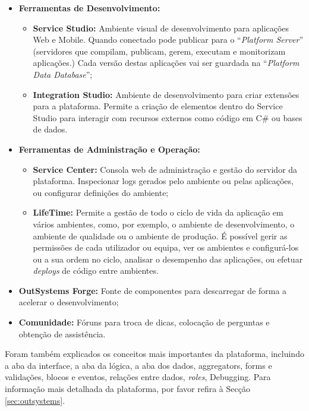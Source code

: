       \begin{itemize} 
        \item \textbf{Ferramentas de Desenvolvimento:}
          \begin{itemize}
            \item \textbf{Service Studio:} Ambiente visual de desenvolvimento para aplicações Web e Mobile. Quando conectado pode publicar para o ``\textit{Platform Server}'' (servidores que compilam, publicam, gerem, executam e monitorizam aplicações.) Cada versão destas aplicações vai ser guardada na ``\textit{Platform Data Database}'';
            \item \textbf{Integration Studio:} Ambiente de desenvolvimento para criar extensões para a plataforma. Permite a criação de elementos dentro do Service Studio para interagir com recursos externos como código em C\# ou bases de dados.
          \end{itemize}
        \item \textbf{Ferramentas de Administração e Operação:}
          \begin{itemize}
            \item \textbf{Service Center:} Consola web de administração e gestão do servidor da plataforma. Inspecionar logs gerados pelo ambiente ou pelas aplicações, ou configurar definições do ambiente;
            \item \textbf{LifeTime:} Permite a gestão de todo o ciclo de vida da aplicação em vários ambientes, como, por exemplo, o ambiente de desenvolvimento, o ambiente de qualidade ou o ambiente de produção. É possível gerir as permissões de cada utilizador ou equipa, ver os ambientes e configurá-los ou a sua ordem no ciclo, analisar o desempenho das aplicações, ou efetuar \textit{deploys} de código entre ambientes.
          \end{itemize}
        \item \textbf{OutSystems Forge:} Fonte de componentes para descarregar de forma a acelerar o desenvolvimento;
        \item \textbf{Comunidade:} Fóruns para troca de dicas, colocação de perguntas e obtenção de assistência\cite{outsystems-components-and-tools}.
      \end{itemize}

      Foram também explicados os conceitos mais importantes da plataforma, incluindo a aba da interface, a aba da lógica, a aba dos dados, aggregators, forms e validações, blocos e eventos, relações entre dados, \textit{roles}, Debugging. Para informação mais detalhada da plataforma, por favor refira à Secção \ref{sec:outsystems}.
    
